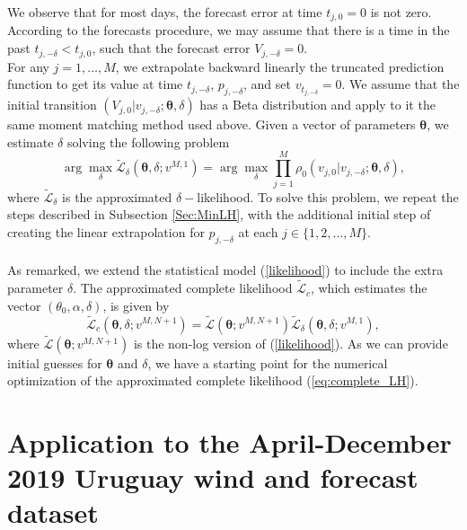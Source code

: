 \documentclass[11pt]{article}
\theoremstyle{definition}
\begin{document}
We observe that for most days, the forecast error at time $t_{j,0}=0$ is not zero. According to the forecasts procedure, we may assume that there is a time in the past $t_{j,-\delta}<t_{j,0}$, such that the forecast error $V_{j,-\delta}=0$.\\

For any $j=1, \ldots, M$, we extrapolate backward linearly the truncated prediction function to get its value at time $t_{j,-\delta}$, $p_{j,-\delta}$, and set $v_{t_{j,-\delta}}=0$. We assume that the initial transition $(V_{j, 0}|v_{j,-\delta};\bm{\theta},\delta)$ 
has a Beta distribution and apply to it the same moment matching method used above. Given a vector of parameters $\bm{\theta}$, we estimate $\delta$ solving the following problem
\begin{equation}
\arg\max_{\delta}\tilde{\mathcal{L}}_{\delta}\left(\bm{\theta},\delta; v^{M,1}\right) = \arg\max_{\delta}\prod\limits_{j=1}^M \rho_0 \left(v_{j, 0}|v_{j,-\delta};\bm{\theta},\delta\right),
\label{eq:likelihood_delta}
\end{equation}
where $\tilde{\mathcal{L}}_\delta$ is the approximated $\delta-$likelihood. To solve this problem, we repeat the steps described in Subsection \ref{Sec:MinLH}, with the additional initial step of creating the linear extrapolation for $p_{j,-\delta}$ at each $j\in\{1,2,\dots,M\}$.\\
\quad\\
As remarked, we extend the statistical model (\ref{likelihood}) to include the extra parameter $\delta$. The approximated complete likelihood $\tilde{\mathcal{L}}_c$, which estimates the vector $(\theta_0,\alpha,\delta)$, is given by
\begin{equation}
\tilde{\mathcal{L}}_c\left(\bm{\theta},\delta; v^{M,N +1}\right)=\tilde{\mathcal{L}}\left(\bm{\theta}; v^{M,N +1}\right)\tilde{\mathcal{L}}_{\delta}\left(\bm{\theta},\delta; v^{M,1}\right),
\label{eq:complete_LH}
\end{equation}
where $\tilde{\mathcal{L}}\left(\bm{\theta}; v^{M,N +1}\right)$ is the non-log version of (\ref{likelihood}). As we can provide initial guesses for $\bm{\theta}$ and $\delta$, we have a starting point for the numerical optimization of the approximated complete likelihood (\ref{eq:complete_LH}).



\section{Application to the April-December 2019 Uruguay wind and forecast dataset} \label{Section_6}
\end{document}
